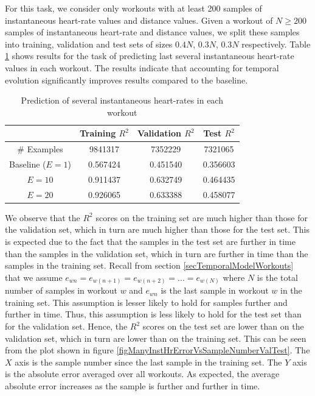 \documentclass{acm_proc_article-sp}
\begin{document}
For this task, we consider only workouts with at least 200 samples of instantaneous heart-rate values and distance values. Given a workout of $N \geq 200$ samples of instantaneous heart-rate and distance values, we split these samples into training, validation and test sets of sizes $0.4N$, $0.3N$, $0.3N$ respectively. Table \ref{tableInstManyHr} shows results for the task of predicting last several instantaneous heart-rate values in each workout. The results indicate that accounting for temporal evolution significantly improves results compared to the baseline. 

\begin{table}[H]
\centering
\begin{tabular}{|c|c|c|c|} \hline
& Training $R^2$ & Validation $R^2$ & Test $R^2$ \\ \hline
\# Examples &  9841317 & 7352229 & 7321065 \\ \hline
Baseline ($E = 1$) & 0.567424 & 0.451540 & 0.356603 \\ \hline
$E = 10$ & 0.911437 & 0.632749 & 0.464435 \\ \hline
$E = 20$ &  0.926065 & 0.633388 & 0.458077 \\ \hline
\end{tabular}
\caption{Prediction of several instantaneous heart-rates in each workout}
\label{tableInstManyHr}
\end{table}

We observe that the $R^2$ scores on the training set are much higher than those for the validation set, which in turn are much higher than those for the test set. This is expected due to the fact that the samples in the test set are further in time than the samples in the validation set, which in turn are further in time than the samples in the training set. Recall from section \ref{secTemporalModelWorkouts} that we assume $e_{wn} = e_{w(n+1)} = e_{w(n+2)} = ... = e_{w(N)}$ where $N$ is the total number of samples in workout $w$ and $e_{wn}$ is the last sample in workout $w$ in the training set. This assumption is lesser likely to hold for samples further and further in time. Thus, this assumption is less likely to hold for the test set than for the validation set. Hence, the $R^2$ scores on the test set are lower than on the validation set, which in turn are lower than on the training set. This can be seen from the plot shown in figure \ref{figManyInstHrErrorVsSampleNumberValTest}. The $X$ axis is the sample number since the last sample in the training set. The $Y$ axis is the absolute error averaged over all workouts. As expected, the average absolute error increases as the sample is further and further in time.
\end{document}
